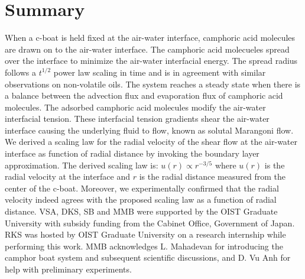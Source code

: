 \documentclass[aps, twocolumn, floatfix, superscriptaddress]{revtex4}
\begin{document}
\section{Summary}
\label{sec:summary}
When a c-boat is held fixed at the air-water interface, camphoric acid molecules are drawn on to the air-water interface. The camphoric acid molecueles spread over the interface to minimize the air-water interfacial energy. The spread radius follows a $t^{1/2}$ power law scaling in time and is in agreement with similar observations on non-volatile oils. The system reaches a steady state when there is a balance between the advection flux and evaporation flux of camphoric acid molecules. The adsorbed camphoric acid molecules modify the air-water interfacial tension. These interfacial tension gradients shear the air-water interface causing the underlying fluid to flow, known as solutal Marangoni flow. We derived a scaling law for the radial velocity of the shear flow at the air-water interface as function of radial distance by invoking the boundary layer approximation. The derived scaling law is: $u(r) \propto r^{-3/5}$ where $u(r)$ is the radial velocity at the interface and $r$ is the radial distance measured from the center of the c-boat. Moreover, we experimentally confirmed that the radial velocity indeed agrees with the proposed scaling law as a function of radial distance.       
\acknowledgments
VSA, DKS, SB and MMB were supported by the OIST Graduate University with subsidy funding from the Cabinet Office, Government of Japan. RKS was hosted by OIST Graduate University on a research internship while performing this work. MMB acknowledges L. Mahadevan for introducing the camphor boat system and subsequent scientific discussions, and D. Vu Anh for help with preliminary experiments.


\end{document}
